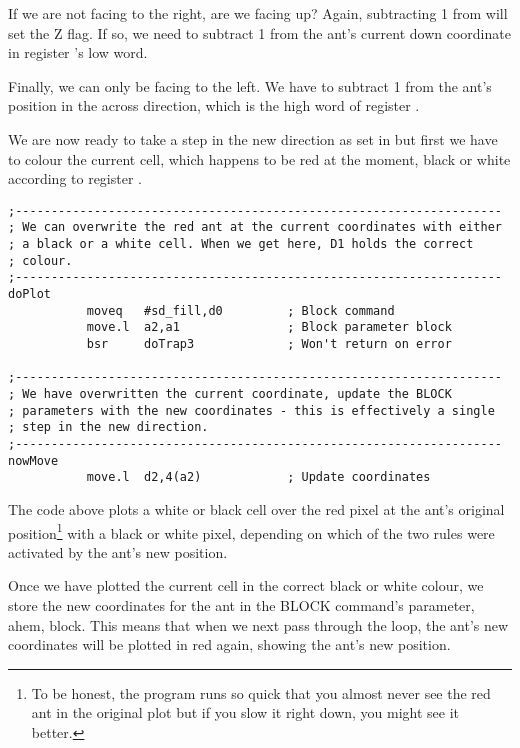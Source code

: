 If we are not facing to the right, are we facing up? Again, subtracting 1 from  will set the Z flag. If so, we need to subtract 1 from the ant's current down coordinate in register 's low word.

Finally, we can only be facing to the left. We have to subtract 1 from the ant's position in the across direction, which is the high word of register .

We are now ready to take a step in the new direction as set in  but first we have to colour the current cell, which happens to be red at the moment, black or white according to register .


\begin{lstlisting}[firstnumber=last,caption={Langtons Ant - Plot New Cell Colour}]
;--------------------------------------------------------------------
; We can overwrite the red ant at the current coordinates with either
; a black or a white cell. When we get here, D1 holds the correct
; colour.
;--------------------------------------------------------------------
doPlot
           moveq   #sd_fill,d0         ; Block command
           move.l  a2,a1               ; Block parameter block
           bsr     doTrap3             ; Won't return on error

;--------------------------------------------------------------------
; We have overwritten the current coordinate, update the BLOCK 
; parameters with the new coordinates - this is effectively a single
; step in the new direction.
;--------------------------------------------------------------------
nowMove
           move.l  d2,4(a2)            ; Update coordinates

\end{lstlisting}

The code above plots a white or black cell over the red pixel at the ant's original position\footnote{To be honest, the program runs so quick that you almost never see the red ant in the original plot but if you slow it right down, you might see it better.} with a black or white pixel, depending on which of the two rules were activated by the ant's new position.

Once we have plotted the current cell in the correct black or white colour, we store the new coordinates for the ant in the BLOCK command's parameter, ahem, block. This means that when we next pass through the loop, the ant's new coordinates will be plotted in red again, showing the ant's new position.

